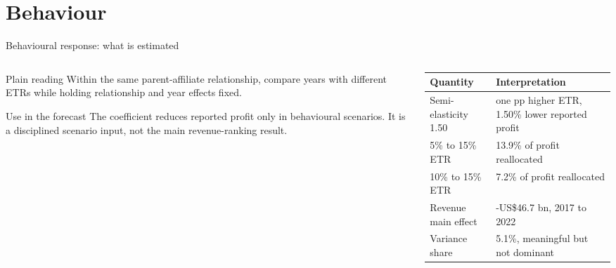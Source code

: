 \documentclass[aspectratio=169, 11pt]{beamer}
\newcommand{\USD}{US\$}
\begin{document}
\section{Behaviour}

\begin{frame}{Behavioural response: what is estimated}
\footnotesize
\begin{center}
\end{center}

\vspace{0.25em}
\begin{columns}[T]
\begin{column}{0.48\textwidth}
\begin{block}{Plain reading}
  Within the same parent-affiliate relationship, compare years with different ETRs while holding relationship and year effects fixed.
\end{block}
\begin{alertblock}{Use in the forecast}
  The coefficient reduces reported profit only in behavioural scenarios. It is a disciplined scenario input, not the main revenue-ranking result.
\end{alertblock}
\end{column}
\begin{column}{0.49\textwidth}
\begin{center}
\scriptsize
\setlength{\tabcolsep}{3.5pt}
\begin{tabular}{@{}L{2.55cm}L{3.05cm}@{}}
  \toprule
  Quantity & Interpretation \\
  \midrule
  Semi-elasticity 1.50 & one pp higher ETR, 1.50\% lower reported profit \\
  5\% to 15\% ETR & 13.9\% of profit reallocated \\
  10\% to 15\% ETR & 7.2\% of profit reallocated \\
  Revenue main effect & -\USD46.7 bn, 2017 to 2022 \\
  Variance share & 5.1\%, meaningful but not dominant \\
  \bottomrule
\end{tabular}
\end{center}

\end{column}
\end{columns}
\end{frame}
\end{document}
